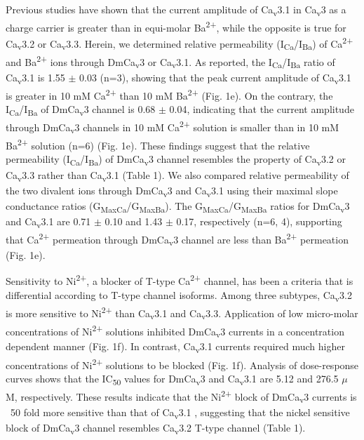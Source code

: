 Previous studies have shown that the current amplitude of Ca\textsubscript{v}3.1 in Ca\textsubscript{v}3 as a charge carrier is greater than in equi-molar Ba\textsuperscript{2+}, while the opposite is true for Ca\textsubscript{v}3.2 or Ca\textsubscript{v}3.3\cite{mcrory:2000aa,shcheglovitov:2007aa}.
Herein, we determined relative permeability (I\textsubscript{Ca}/I\textsubscript{Ba}) of Ca\textsuperscript{2+} and Ba\textsuperscript{2+} ions through DmCa\textsubscript{v}3 or Ca\textsubscript{v}3.1.
As reported, the I\textsubscript{Ca}/I\textsubscript{Ba} ratio of Ca\textsubscript{v}3.1 is 1.55 $\pm$ 0.03 (n=3), showing that the peak current amplitude of Ca\textsubscript{v}3.1 is greater in 10 mM Ca\textsuperscript{2+} than 10 mM Ba\textsuperscript{2+} (Fig. 1e).
On the contrary, the I\textsubscript{Ca}/I\textsubscript{Ba} of DmCa\textsubscript{v}3 channel is 0.68 $\pm$ 0.04, indicating that the current amplitude through DmCa\textsubscript{v}3 channels in 10 mM Ca\textsuperscript{2+} solution is smaller than in 10 mM Ba\textsuperscript{2+} solution (n=6) (Fig. 1e).
These findings suggest that the relative permeability (I\textsubscript{Ca}/I\textsubscript{Ba}) of DmCa\textsubscript{v}3 channel resembles the property of Ca\textsubscript{v}3.2 or Ca\textsubscript{v}3.3 rather than Ca\textsubscript{v}3.1 (Table 1).
We also compared relative permeability of the two divalent ions through DmCa\textsubscript{v}3 and Ca\textsubscript{v}3.1 using their maximal slope conductance ratios (G\textsubscript{MaxCa}/G\textsubscript{MaxBa}).
The G\textsubscript{MaxCa}/G\textsubscript{MaxBa} ratios for DmCa\textsubscript{v}3 and Ca\textsubscript{v}3.1 are 0.71 $\pm$ 0.10 and 1.43 $\pm$ 0.17, respectively (n=6, 4), supporting that Ca\textsuperscript{2+} permeation through DmCa\textsubscript{v}3 channel are less than Ba\textsuperscript{2+} permeation (Fig. 1e).

Sensitivity to Ni\textsuperscript{2+}, a blocker of T-type Ca\textsuperscript{2+} channel, has been a criteria that is differential according to T-type channel isoforms\cite{10585925}.
Among three subtypes, Ca\textsubscript{v}3.2 is more sensitive to Ni\textsuperscript{2+} than Ca\textsubscript{v}3.1 and Ca\textsubscript{v}3.3.
Application of low micro-molar concentrations of Ni\textsuperscript{2+} solutions inhibited DmCa\textsubscript{v}3 currents in a concentration dependent manner (Fig. 1f).
In contrast, Ca\textsubscript{v}3.1 currents required much higher concentrations of Ni\textsuperscript{2+} solutions to be blocked (Fig. 1f).
Analysis of dose-response curves shows that the IC\textsubscript{50} values for DmCa\textsubscript{v}3 and Ca\textsubscript{v}3.1 are 5.12 and 276.5 $\mu$M, respectively.
These results indicate that the Ni\textsuperscript{2+} block of DmCa\textsubscript{v}3 currents is ~50 fold more sensitive than that of Ca\textsubscript{v}3.1 , suggesting that the nickel sensitive block of DmCa\textsubscript{v}3 channel resembles Ca\textsubscript{v}3.2 T-type channel (Table 1).
    
    
    
    
    
    
    
    
    
    
    
    
    
    
    
    
    
  
  
  
  
  